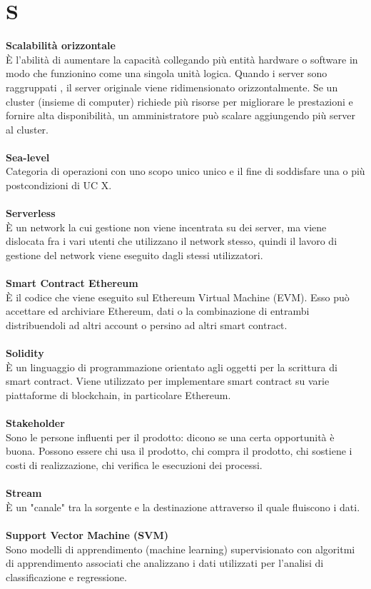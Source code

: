 \section{S}
\textbf{Scalabilità orizzontale}\\
È l'abilità di aumentare la capacità collegando più entità hardware o software in modo che funzionino come una singola unità logica. Quando i server sono raggruppati , il server originale viene ridimensionato orizzontalmente. Se un cluster (insieme di computer) richiede più risorse per migliorare le prestazioni e fornire alta disponibilità, un amministratore può scalare aggiungendo più server al cluster. \\ \\
\textbf{Sea-level}\\
Categoria di operazioni con uno scopo unico unico e il fine di soddisfare una o più postcondizioni di UC X. \\ \\
\textbf{Serverless}\\
È un network la cui gestione non viene incentrata su dei server, ma viene dislocata fra i vari utenti che utilizzano il network stesso, quindi il lavoro di gestione del network viene eseguito dagli stessi utilizzatori. \\ \\
\textbf{Smart Contract Ethereum}\\
È il codice che viene eseguito sul Ethereum Virtual Machine (EVM). Esso può accettare ed archiviare Ethereum, dati o la combinazione di entrambi distribuendoli ad altri account o persino ad altri smart contract. \\ \\
\textbf{Solidity}\\
È un linguaggio di programmazione orientato agli oggetti per la scrittura di smart contract. Viene utilizzato per implementare smart contract su varie piattaforme di blockchain, in particolare Ethereum. \\ \\
\textbf{Stakeholder}\\
Sono le persone influenti per il prodotto: dicono se una certa opportunità è buona. Possono essere chi usa il prodotto, chi compra il prodotto, chi sostiene i costi di realizzazione, chi verifica le esecuzioni dei processi. \\ \\
\textbf{Stream}\\
È un "canale" tra la sorgente e la destinazione attraverso il quale fluiscono i dati. \\ \\
\textbf{Support Vector Machine (SVM)}\\
Sono modelli di apprendimento (machine learning) supervisionato con algoritmi di apprendimento associati che analizzano i dati utilizzati per l'analisi di classificazione e regressione. \\ \\
\clearpage
